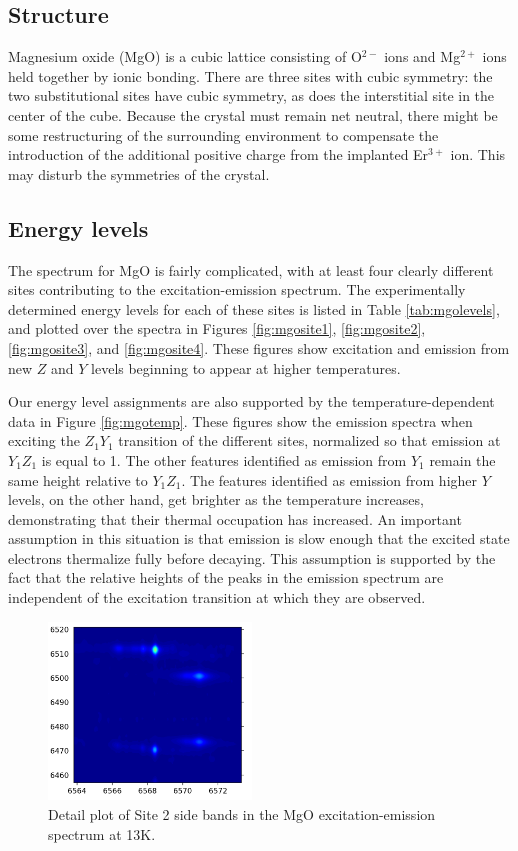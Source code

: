 \documentclass[12pt]{puthesis}
\newcommand{\erbium}[1][ ]{Er$^{3+}$#1}
\begin{document}
\subsection{Structure}
Magnesium oxide (MgO) is a cubic lattice consisting of O$^{2-}$ ions and Mg$^{2+}$ ions held together by ionic bonding. There are three sites with cubic symmetry: the two substitutional sites have cubic symmetry, as does the interstitial site in the center of the cube. Because the crystal must remain net neutral, there might be some restructuring of the surrounding environment to compensate the introduction of the additional positive charge from the implanted \erbium ion. This may disturb the symmetries of the crystal.

\newpage 
\subsection{Energy levels}
The spectrum for MgO is fairly complicated, with at least four clearly different sites contributing to the excitation-emission spectrum. The experimentally determined energy levels for each of these sites is listed in Table \ref{tab:mgolevels}, and plotted over the spectra in Figures \ref{fig:mgosite1}, \ref{fig:mgosite2}, \ref{fig:mgosite3}, and \ref{fig:mgosite4}. These figures show excitation and emission from new $Z$ and $Y$ levels beginning to appear at higher temperatures.

Our energy level assignments are also supported by the temperature-dependent data in Figure \ref{fig:mgotemp}. These figures show the emission spectra when exciting the $Z_{1}Y_{1}$ transition of the different sites, normalized so that emission at $Y_{1}Z_{1}$ is equal to 1. The other features identified as emission from $Y_{1}$ remain the same height relative to $Y_{1}Z_{1}$. The features identified as emission from higher $Y$ levels, on the other hand, get brighter as the temperature increases, demonstrating that their thermal occupation has increased. An important assumption in this situation is that emission is slow enough that the excited state electrons thermalize fully before decaying. This assumption is supported by the fact that the relative heights of the peaks in the emission spectrum are independent of the excitation transition at which they are observed.

\begin{figure}
  \centering
  \includegraphics[width=0.48\textwidth]{Site2Multiplicity}
  \caption{Detail plot of Site 2 side bands in the MgO excitation-emission spectrum at 13K.}
  \label{fig:site2sidebands}
\end{figure}
\end{document}

